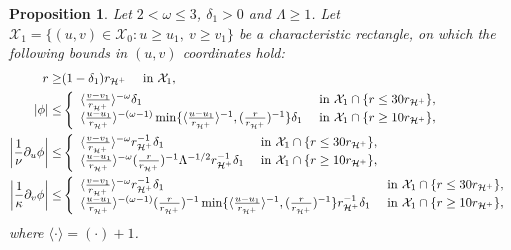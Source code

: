\documentclass[10pt, reqno]{amsart}
\newtheorem{proposition}[theorem]{Proposition}
\theoremstyle{definition}
\theoremstyle{remark}
\theoremstyle{conjecture}
\numberwithin{equation}{section}
\newcommand{\brk}[1]{\langle#1\rangle}
\newcommand{\set}[1]{\{#1\}}
\newcommand{\rd}{\partial}
\newcommand{\0}{\emptyset}
\newcommand{\dlt}{\delta}
\newcommand{\kpp}{\kappa}
\newcommand{\Lmb}{\Lambda}
\newcommand{\omg}{\omega}
\newcommand{\calH}{\mathcal H}
\newcommand{\calX}{\mathcal X}
\newcommand{\dur}{\nu}
\newcommand{\EH}{\calH^{+}}
\newcommand{\Abs}[1]{\left\vert #1 \right\vert}
\begin{document}
\begin{proposition} \label{prop:bg-uv}
Let $2 < \omg \leq 3$, $\dlt_{1} > 0$ and $\Lmb \geq 1$. Let $\calX_{1} = \set{(u, v) \in \calX_{0} : u \geq u_{1}, \ v \geq v_{1}}$ be a characteristic rectangle, on which the following bounds in $(u,v)$ coordinates hold:
\begin{align}
	r \geq & (1 - \dlt_{1}) r_{\EH} \quad \hbox{ in } \calX_{1}, \label{eq:bg-uv:r-bnd} \\
	\Abs{\phi} \leq & \left\{
\begin{array}{ll}
\brk{\frac{v-v_{1}}{r_{\EH}}}^{-\omg} \dlt_{1} & \hbox{ in } \calX_{1} \cap \set{r \leq 30 r_{\EH}} , \\
\brk{\frac{u-u_{1}}{r_{\EH}}}^{-(\omg-1)} \min \set{ \brk{\frac{u-u_{1}}{r_{\EH}}}^{-1}, (\frac{r}{r_{\EH}})^{-1}} \dlt_{1}  & \hbox{ in } \calX_{1} \cap \set{r \geq 10 r_{\EH}} ,
\end{array}\right. 		\label{eq:bg-uv:phi} \\
%
	\Abs{\frac{1}{\dur}\rd_{u} \phi} \leq & \left\{
\begin{array}{ll}
\brk{\frac{v-v_{1}}{r_{\EH}}}^{-\omg}  r_{\EH}^{-1} \dlt_{1} & \hbox{ in } \calX_{1} \cap \set{r \leq 30 r_{\EH}} , \\
\brk{\frac{u-u_{1}}{r_{\EH}}}^{-\omg} (\frac{r}{r_{\EH}})^{-1} \Lmb^{-1/2} r_{\EH}^{-1} \dlt_{1}  & \hbox{ in } \calX_{1} \cap \set{r \geq 10 r_{\EH}} ,
\end{array}\right. 	\label{eq:bg-uv:duphi} \\
%
	\Abs{\frac{1}{\kpp}\rd_{v} \phi} \leq & \left\{
\begin{array}{ll}
\brk{\frac{v-v_{1}}{r_{\EH}}}^{-\omg}  r_{\EH}^{-1} \dlt_{1} & \hbox{ in } \calX_{1} \cap \set{r \leq 30 r_{\EH}} , \\
\brk{\frac{u-u_{1}}{r_{\EH}}}^{-(\omg-1)} (\frac{r}{r_{\EH}})^{-1}  \min \set{ \brk{\frac{u-u_{1}}{r_{\EH}}}^{-1}, (\frac{r}{r_{\EH}})^{-1}} r_{\EH}^{-1} \dlt_{1}  & \hbox{ in } \calX_{1} \cap \set{r \geq 10 r_{\EH}} ,
\end{array}\right. 	\label{eq:bg-uv:dvphi}
\end{align}
where $\brk{\cdot} = (\cdot) + 1$.


\end{proposition}
\end{document}
